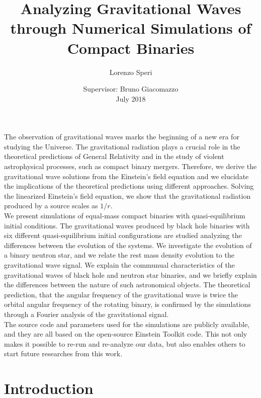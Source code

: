 \documentclass[twoside,english, a4paper, 12pt]{shared/uiofysmaster}
\author{Lorenzo Speri}
\title{\bf{Analyzing Gravitational Waves through Numerical Simulations of Compact Binaries}}
\date{Supervisor:
Bruno Giacomazzo\\
July 2018}
\begin{document}

\maketitle
\clearpage

\tableofcontents
\clearpage

\begin{abstract1}
The observation of gravitational waves marks the beginning of a new era for studying the Universe.
The gravitational radiation plays a crucial role in the theoretical predictions of General Relativity and in the study of violent astrophysical processes, such as compact binary mergers. 
Therefore, we derive the gravitational wave solutions from the Einstein's field equation and we elucidate the implications of the theoretical predictions using different approaches.
Solving the linearized Einstein's field equation, we show that the gravitational radiation produced by a source scales as $1/r$. \\
We present simulations of equal-mass compact binaries with quasi-equilibrium initial conditions.
The gravitational waves produced by black hole binaries with six different quasi-equilibrium initial configurations are studied analyzing the differences between the evolution of the systems.
We investigate the evolution of a binary neutron star, and we relate the rest mass density evolution to the gravitational wave signal.
We explain the communual characteristics of the gravitational waves of black hole and neutron star binaries, and we briefly explain the differences between the nature of such astronomical objects.
The theoretical prediction, that the angular frequency of the gravitational wave is twice the orbital angular frequency of the rotating binary, is confirmed by the simulations through a Fourier analysis of the gravitational signal.\\
The source code and parameters used for the simulations are publicly available, and they are all based on the open-source Einstein Toolkit code.  
This not only makes it possible to re-run and re-analyze our data, but also enables others to start future researches from this work.
\end{abstract1}

\clearpage
\section{Introduction}

\end{document}
